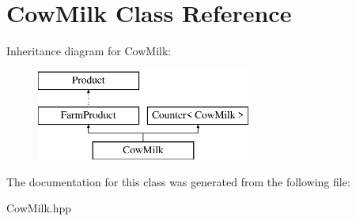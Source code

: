 \hypertarget{class_cow_milk}{}\section{Cow\+Milk Class Reference}
\label{class_cow_milk}
Inheritance diagram for Cow\+Milk\+:\begin{figure}[H]
\begin{center}
\leavevmode
\includegraphics[height=3.000000cm]{class_cow_milk}
\end{center}
\end{figure}


The documentation for this class was generated from the following file\+:\begin{DoxyCompactItemize}
\item 
Cow\+Milk.\+hpp\end{DoxyCompactItemize}
